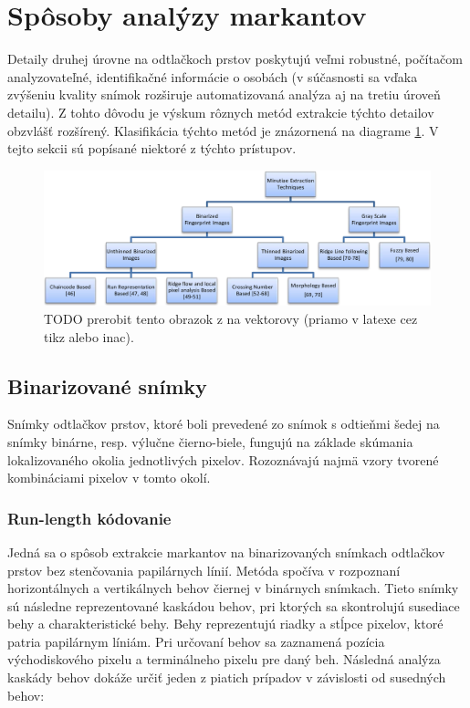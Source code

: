   \section{Spôsoby analýzy markantov} \label{sec:analyza_markantov}
  Detaily druhej úrovne na odtlačkoch prstov poskytujú veľmi robustné, počítačom analyzovateľné, identifikačné informácie o osobách (v súčasnosti sa vďaka
  zvýšeniu kvality snímok rozširuje automatizovaná analýza aj na tretiu úroveň detailu). Z tohto dôvodu je výskum rôznych metód extrakcie týchto detailov
  obzvlášť rozšírený. Klasifikácia týchto metód je znázornená na diagrame \ref{obr:diagram_extrakcia_markantov}. V tejto sekcii sú popísané niektoré
  z týchto prístupov.

  \begin{figure}[h]
    \centering
    \includegraphics[width=0.8\linewidth]{obrazky-figures/klasifikacia_extrakcie_markantov.png}
    \caption{TODO prerobit tento obrazok z \cite{bansal2011minutiae} na vektorovy (priamo v latexe cez tikz alebo inac).}
    \label{obr:diagram_extrakcia_markantov}
  \end{figure}

  \subsection{Binarizované snímky}
  Snímky odtlačkov prstov, ktoré boli prevedené zo snímok s odtieňmi šedej na snímky binárne, resp. výlučne čierno-biele, fungujú na základe skúmania
  lokalizovaného okolia jednotlivých pixelov. Rozoznávajú najmä vzory tvorené kombináciami pixelov v tomto okolí.

  \subsubsection{Run-length kódovanie}
  Jedná sa o spôsob extrakcie markantov na binarizovaných snímkach odtlačkov prstov bez stenčovania papilárnych línií.
  Metóda spočíva v rozpoznaní horizontálnych a vertikálnych behov čiernej v binárnych snímkach. Tieto snímky sú následne reprezentované kaskádou behov,
  pri ktorých sa skontrolujú susediace behy a charakteristické behy. Behy reprezentujú riadky a stĺpce pixelov, ktoré patria papilárnym líniám. Pri určovaní
  behov sa zaznamená pozícia východiskového pixelu a terminálneho pixelu pre daný beh. Následná analýza kaskády behov dokáže určiť jeden z piatich
  prípadov v závislosti od susedných behov:

